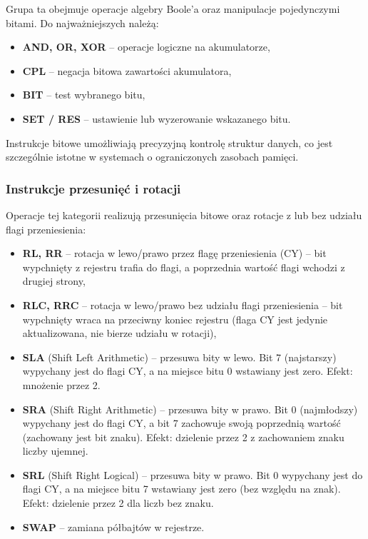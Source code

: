 \documentclass{article}
\begin{document}
Grupa ta obejmuje operacje algebry Boole’a oraz manipulacje pojedynczymi bitami. Do najważniejszych należą:

\begin{itemize}
	\item \textbf{AND, OR, XOR} -- operacje logiczne na akumulatorze,
	\item \textbf{CPL} -- negacja bitowa zawartości akumulatora,
	\item \textbf{BIT} -- test wybranego bitu,
	\item \textbf{SET / RES} -- ustawienie lub wyzerowanie wskazanego bitu.
\end{itemize}

Instrukcje bitowe umożliwiają precyzyjną kontrolę struktur danych, co jest szczególnie istotne w systemach o ograniczonych zasobach pamięci.

\subsubsection{Instrukcje przesunięć i rotacji}

Operacje tej kategorii realizują przesunięcia bitowe oraz rotacje z lub bez udziału flagi przeniesienia:

\begin{itemize}
\item \textbf{RL, RR} – rotacja w lewo/prawo przez flagę przeniesienia (CY) – bit wypchnięty z rejestru trafia do flagi, a poprzednia wartość flagi wchodzi z drugiej strony,
\item \textbf{RLC, RRC} – rotacja w lewo/prawo bez udziału flagi przeniesienia – bit wypchnięty wraca na przeciwny koniec rejestru (flaga CY jest jedynie aktualizowana, nie bierze udziału w rotacji),
\item \textbf{SLA} (Shift Left Arithmetic) – przesuwa bity w lewo. Bit 7 (najstarszy) wypychany jest do flagi CY, a na miejsce bitu 0 wstawiany jest zero. Efekt: mnożenie przez 2.
\item \textbf{SRA} (Shift Right Arithmetic) – przesuwa bity w prawo. Bit 0 (najmłodszy) wypychany jest do flagi CY, a bit 7 zachowuje swoją poprzednią wartość (zachowany jest bit znaku). Efekt: dzielenie przez 2 z zachowaniem znaku liczby ujemnej.
\item \textbf{SRL} (Shift Right Logical) – przesuwa bity w prawo. Bit 0 wypychany jest do flagi CY, a na miejsce bitu 7 wstawiany jest zero (bez względu na znak). Efekt: dzielenie przez 2 dla liczb bez znaku.
	\item \textbf{SWAP} -- zamiana półbajtów w rejestrze.
\end{itemize}
\end{document}
